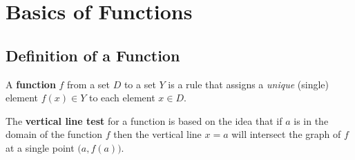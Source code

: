 \chapter{Basics of Functions}
\section{Definition of a Function}

\begin{defn}
  A \textbf{function} \(f\) from a set \(D\) to a set \(Y\) is a rule that assigns a \emph{unique} (single) element \(f(x) \in Y\) to each element \(x \in D\).
\end{defn}

\begin{defn}
  The \textbf{vertical line test} for a function is based on the idea that if \(a\) is in the domain of the function \(f\) then the vertical line \(x=a\) will intersect the graph of \(f\) at a single point \( \big(a,f(a)\big)\).
\end{defn}

\begin{figure}[H]
  \begin{center}
  \end{center}
\end{figure}

